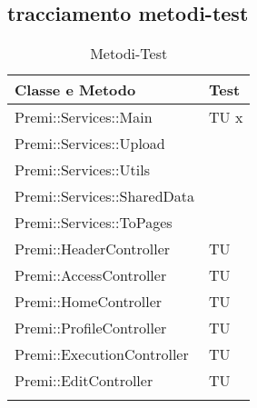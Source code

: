 \subsection{tracciamento metodi-test}
\begin{center}
\bgroup
\def\arraystretch{1.5}
\begin{longtable}{ | p{12cm} | p{2cm} | }
\hline
\cellcolor[gray]{0.9} \textbf{Classe e Metodo} & \cellcolor[gray]{0.9} \textbf{Test}
 \\ \hline
Premi::Services::Main & TU x \\ \hline 
Premi::Services::Upload & \\ \hline
Premi::Services::Utils  & \\ \hline
Premi::Services::SharedData & \\ \hline
Premi::Services::ToPages & \\ \hline
Premi::HeaderController & TU \\ \hline
Premi::AccessController & TU \\ \hline
Premi::HomeController & TU \\ \hline
Premi::ProfileController & TU \\ \hline
Premi::ExecutionController & TU \\ \hline
Premi::EditController & TU \\ \hline

\caption{Metodi-Test}
\end{longtable}
\egroup
\end{center}